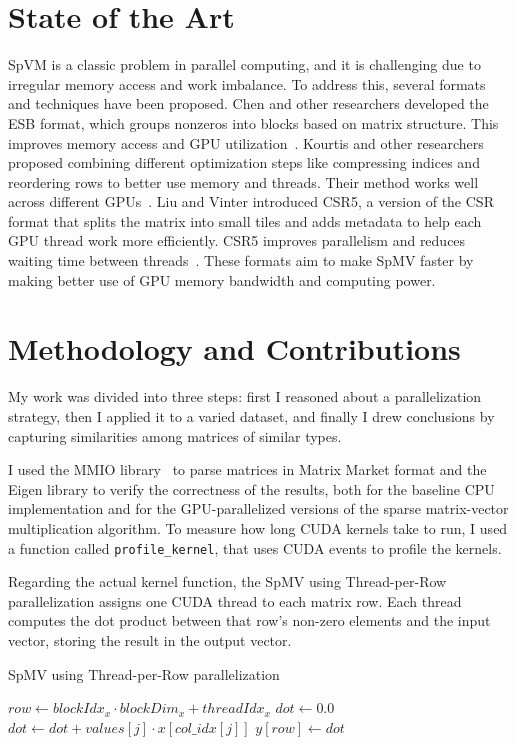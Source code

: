 \documentclass[conference]{IEEEtran}
\begin{document}
\section{State of the Art}

SpVM is a classic problem in parallel computing, and it is challenging due to irregular memory access and work imbalance. To address this, several formats and techniques have been proposed. Chen and other researchers developed the ESB format, which groups nonzeros into blocks based on matrix structure. This improves memory access and GPU utilization~\cite{chen2017esb}. Kourtis and other researchers proposed combining different optimization steps like compressing indices and reordering rows to better use memory and threads. Their method works well across different GPUs~\cite{kourtis2016optimizing}. Liu and Vinter introduced CSR5, a version of the CSR format that splits the matrix into small tiles and adds metadata to help each GPU thread work more efficiently. CSR5 improves parallelism and reduces waiting time between threads~\cite{liu2015csr5}. These formats aim to make SpMV faster by making better use of GPU memory bandwidth and computing power.

\section{Methodology and Contributions}\label{sec:methodology}

My work was divided into three steps: first I reasoned about a parallelization strategy, then I applied it to a varied dataset, and finally I drew conclusions by capturing similarities among matrices of similar types.

I used the MMIO library~\cite{matrixmarketmmio} to parse matrices in Matrix Market format and the Eigen library to verify the correctness of the results, both for the baseline CPU implementation and for the GPU-parallelized versions of the sparse matrix-vector multiplication algorithm. To measure how long CUDA kernels take to run, I used a function called \texttt{profile\_kernel}, that uses CUDA events to profile the kernels.

Regarding the actual kernel function, the SpMV using Thread-per-Row parallelization assigns one CUDA thread to each matrix row. Each thread computes the dot product between that row's non-zero elements and the input vector, storing the result in the output vector.
\begin{algorithm}[ht]
    \caption{SpMV using Thread-per-Row parallelization}
    \begin{algorithmic}[1]
        \State $row \gets blockIdx_x \cdot blockDim_x + threadIdx_x$
            \State $dot \gets 0.0$
                \State $dot \gets dot + values[j] \cdot x[col\_idx[j]]$
            \EndFor
            \State $y[row] \gets dot$
        \EndIf
    \EndProcedure
    \end{algorithmic}
\end{algorithm}
\end{document}
